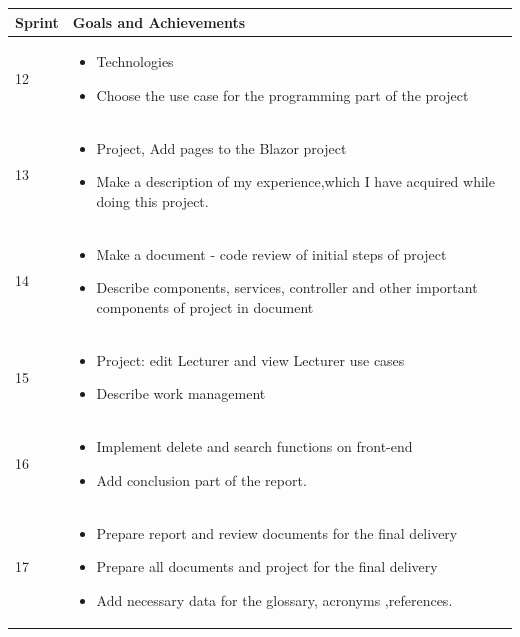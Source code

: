 \documentclass{scrartcl}
\begin{document}
\begin{table}[H]
\begin{center}
\begin{tabular}{| p{2.5cm}| p{12cm} |}
\hline
\rowcolor{LightCyan}
\textbf{Sprint} & \textbf{Goals and Achievements} \\
\hline
 
 
  12               &             
\begin{itemize}
\item Technologies
 \item Choose the use case for the programming part of the project
 

 \end{itemize}\\ \hline
 
  13                &             
\begin{itemize}
\item Project, Add pages to the Blazor project
\item Make a description of my experience,which I have acquired while doing this project. 


 \end{itemize}\\ \hline
  14                &             
\begin{itemize}
 \item Make a document - code review of initial steps of project
 \item Describe components, services, controller and other important components of project in document
\end{itemize}\\ \hline
 
 15                 &             
\begin{itemize}
 \item Project: edit Lecturer and view Lecturer use cases
 \item Describe work management


 \end{itemize}\\ \hline
 16               &             
\begin{itemize}
 
 \item  Implement delete and search functions on front-end
 \item  Add conclusion  part of the report. 


 \end{itemize}\\ \hline
 17               &             
\begin{itemize}
 \item Prepare report and review documents for the final delivery
 \item Prepare all documents and project for the final delivery
 \item Add necessary data for the glossary, acronyms ,references.



\end{itemize}
\end{tabular}
\end{center}
\end{table}
\end{document}
